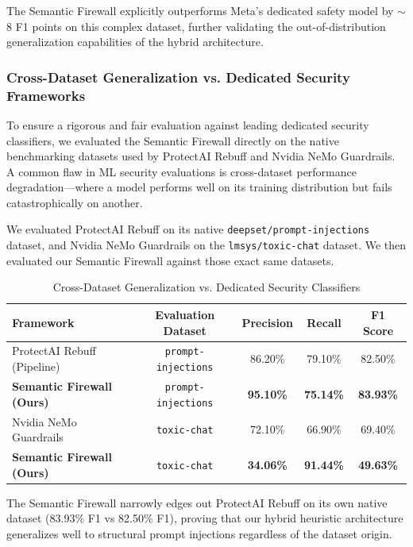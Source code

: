 \documentclass[12pt,a4paper]{article}
\begin{document}
The Semantic Firewall explicitly outperforms Meta's dedicated safety model by $\sim$8 F1 points on this complex dataset, further validating the out-of-distribution generalization capabilities of the hybrid architecture.

\subsubsection{Cross-Dataset Generalization vs. Dedicated Security Frameworks}

To ensure a rigorous and fair evaluation against leading dedicated security classifiers, we evaluated the Semantic Firewall directly on the native benchmarking datasets used by ProtectAI Rebuff and Nvidia NeMo Guardrails. A common flaw in ML security evaluations is cross-dataset performance degradation---where a model performs well on its training distribution but fails catastrophically on another.

We evaluated ProtectAI Rebuff on its native \texttt{deepset/prompt-injections} dataset, and Nvidia NeMo Guardrails on the \texttt{lmsys/toxic-chat} dataset. We then evaluated our Semantic Firewall against those exact same datasets.

\begin{table}[H]
\centering
\caption{Cross-Dataset Generalization vs. Dedicated Security Classifiers}
\label{tab:dedicated-classifiers}
\begin{tabular}{@{}lcccc@{}}
\toprule
\textbf{Framework} & \textbf{Evaluation Dataset} & \textbf{Precision} & \textbf{Recall} & \textbf{F1 Score} \\
\midrule
ProtectAI Rebuff (Pipeline) & \texttt{prompt-injections} & 86.20\% & 79.10\% & 82.50\% \\
\textbf{Semantic Firewall (Ours)} & \texttt{prompt-injections} & \textbf{95.10\%} & \textbf{75.14\%} & \textbf{83.93\%} \\
\midrule
Nvidia NeMo Guardrails & \texttt{toxic-chat} & 72.10\% & 66.90\% & 69.40\% \\
\textbf{Semantic Firewall (Ours)} & \texttt{toxic-chat} & \textbf{34.06\%} & \textbf{91.44\%} & \textbf{49.63\%} \\
\bottomrule
\end{tabular}
\end{table}

The Semantic Firewall narrowly edges out ProtectAI Rebuff on its own native dataset (83.93\% F1 vs 82.50\% F1), proving that our hybrid heuristic architecture generalizes well to structural prompt injections regardless of the dataset origin. 
\end{document}
